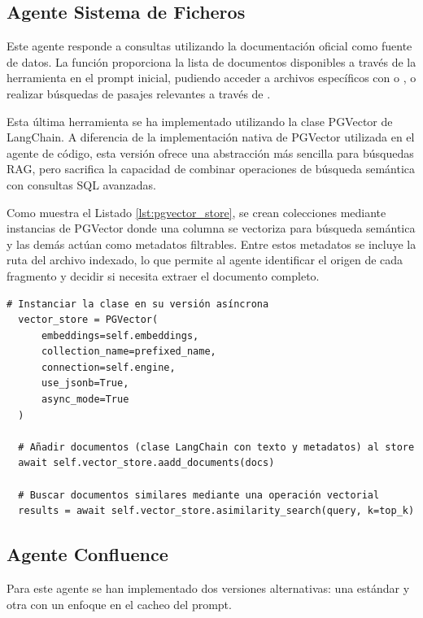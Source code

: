 \subsection{Agente Sistema de Ficheros}
Este agente responde a consultas utilizando la documentación oficial como fuente de datos. La función  proporciona la lista de documentos disponibles a través de la herramienta  en el prompt inicial, pudiendo acceder a archivos específicos con  o , o realizar búsquedas de pasajes relevantes a través de .

Esta última herramienta se ha implementado utilizando la clase PGVector de LangChain. A diferencia de la implementación nativa de PGVector utilizada en el agente de código, esta versión ofrece una abstracción más sencilla para búsquedas RAG, pero sacrifica la capacidad de combinar operaciones de búsqueda semántica con consultas SQL avanzadas.

Como muestra el Listado \ref{lst:pgvector_store}, se crean colecciones mediante instancias de PGVector donde una columna se vectoriza para búsqueda semántica y las demás actúan como metadatos filtrables. Entre estos metadatos se incluye la ruta del archivo indexado, lo que permite al agente identificar el origen de cada fragmento y decidir si necesita extraer el documento completo.

\begin{lstlisting}[caption={\protect\opus{PGVector}: uso de clase para indexar o buscar documentos}, label={lst:pgvector_store}]
  # Instanciar la clase en su versión asíncrona 
  vector_store = PGVector(
      embeddings=self.embeddings,
      collection_name=prefixed_name,
      connection=self.engine,
      use_jsonb=True,
      async_mode=True
  )

  # Añadir documentos (clase LangChain con texto y metadatos) al store
  await self.vector_store.aadd_documents(docs)

  # Buscar documentos similares mediante una operación vectorial
  results = await self.vector_store.asimilarity_search(query, k=top_k)
\end{lstlisting}

\subsection{Agente Confluence}
Para este agente se han implementado dos versiones alternativas: una estándar y otra con un enfoque en el cacheo del prompt.

